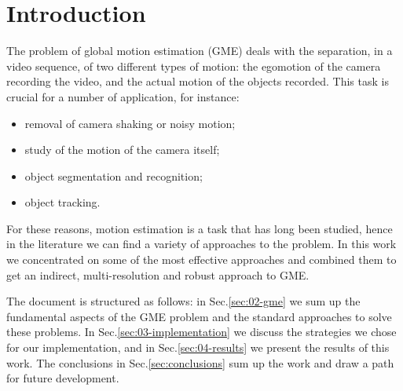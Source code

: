 \section{Introduction}
\label{sec:01-intro}
The problem of global motion estimation (GME) deals with the separation, in a video sequence, of two different types of motion: the egomotion of the camera recording the video, and the actual motion of the objects recorded. This task is crucial for a number of application, for instance:
\begin{itemize}
    \item removal of camera shaking or noisy motion;
    \item study of the motion of the camera itself;
    \item object segmentation and recognition;
    \item object tracking.
\end{itemize}

For these reasons, motion estimation is a task that has long been studied, hence in the literature we can find a variety of approaches to the problem. In this work we concentrated on some of the most effective approaches and combined them to get an indirect, multi-resolution and robust approach to GME.

The document is structured as follows: in Sec.\ref{sec:02-gme} we sum up the fundamental aspects of the GME problem and the standard approaches to solve these problems. In Sec.\ref{sec:03-implementation} we discuss the strategies we chose for our implementation, and in Sec.\ref{sec:04-results} we present the results of this work. The conclusions in Sec.\ref{sec:conclusions} sum up the work and draw a path for future development.
